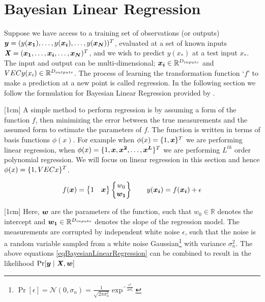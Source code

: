 \section{Bayesian Linear Regression}\label{secBayesianModelling}
\sloppy Suppose we have access to a training set of observations (or outputs) $\boldsymbol{y} = (y(\boldsymbol{x_{1}}), \ldots , y(\boldsymbol{x_{i}}), \ldots , y(\boldsymbol{x_{N}}))^T$, evaluated at a set of known inputs $\bm{\mathit{X}} = (\boldsymbol{x_{1}}, \ldots , \boldsymbol{x_{i}}, \ldots, \boldsymbol{x_{N}})^T$, and we wish to predict $y(x_{*})$ at a test input $x_{*}$. The input and output can be multi-dimensional; $\boldsymbol{x_{i}} \in \mathbb{R}^{D_{inputs}}$ and $\\VEC{y(x_{i})} \in \mathbb{R}^{D_{outputs}}$. The process of learning the transformation function `$f$' to make a prediction at a new point is called regression. In the following section we follow the formulation for Bayesian Linear Regression provided by \cite{mackay2003information}.

[1cm]
A simple method to perform regression is by assuming a form of the function $f$, then minimizing the error between the true measurements and the assumed form to estimate the parameters of $f$. The function is written in terms of basis functions $\phi(x)$. For example when $\phi(x) = \{1, \boldsymbol{x}\}^{T}$ we are performing linear regression, when $\phi(x) = \{1, \boldsymbol{x}, \boldsymbol{x^{2}}, \ldots, \boldsymbol{x^{L}}\}^{T}$ we are performing $L^{th}$ order polynomial regression. We will focus on linear regression in this section and hence $\phi(x) = \{1, \\VEC{x}\}^{T}$.

\begin{equation}\label{eqBayesianLinearRegression}
f(\boldsymbol{x}) = \begin{Bmatrix}
1 & \boldsymbol{x}
\end{Bmatrix}  \begin{Bmatrix}
w_{0}\\ 
\boldsymbol{w_{1}}
\end{Bmatrix}
\quad \quad y(\boldsymbol{x_{i}}) = f(\boldsymbol{x_{i}}) + \epsilon
\end{equation}

[1cm]
Here, $\boldsymbol{w}$ are the parameters of the function, such that $w_{0} \in \mathbb{R}$ denotes the intercept and $\boldsymbol{w_{1}} \in \mathbb{R}^{D_{inputs}}$ denotes the slope of the regression model. The measurements are corrupted by independent white noise $\epsilon$, such that the noise is a random variable sampled from a white noise Gaussian\footnote{$\Pr[\epsilon] = \mathcal{N}(0, \sigma_{n}) = \frac{1}{\sqrt{2\pi\sigma_{n}^{2}}}\exp^{-\frac{\epsilon^{2}}{2\sigma_{n}^{2}}}
$} with variance $\sigma_{n}^{2}$. The above equations \ref{eqBayesianLinearRegression} can be combined to result in the likelihood $\Pr[\boldsymbol{y} \mid \bm{\mathit{X}}, \boldsymbol{w}]$

